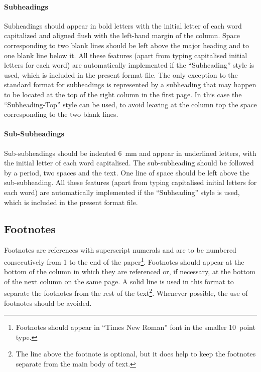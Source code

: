 \documentclass[bibtex,pagenumbers]{stabs2021}
\begin{document}
\paragraph{Subheadings}

Subheadings should appear in bold letters with the initial letter of
each word capitalized and aligned flush with the left-hand margin of
the column. Space corresponding to two blank lines should be left
above the major heading and to one blank line below it. All these
features (apart from typing capitalised initial letters for each word)
are automatically implemented if the ``Subheading'' style is used,
which is included in the present format file. The only exception to
the standard format for subheadings is represented by a subheading
that may happen to be located at the top of the right column in the
first page. In this case the ``Subheading-Top'' style can be used, to
avoid leaving at the column top the space corresponding to the two
blank lines.

\paragraph{Sub-Subheadings}

Sub-subheadings should be indented 6~mm and appear in underlined
letters, with the initial letter of each word capitalised. The
sub-subheading should be followed by a period, two spaces and the
text. One line of space should be left above the sub-subheading. All
these features (apart from typing capitalised initial letters for each
word) are automatically implemented if the ``Subheading'' style is
used, which is included in the present format file.

\subsection{Footnotes}

Footnotes are references with superscript numerals and are to be
numbered consecutively from 1 to the end of the
paper\footnote{Footnotes should appear in ``Times New Roman'' font in
the smaller 10~point type.}. Footnotes should appear at the bottom of
the column in which they are referenced or, if necessary, at the
bottom of the next column on the same page. A solid line is used in
this format to separate the footnotes from the rest of the
text\footnote{The line above the footnote is optional, but it does
help to keep the footnotes separate from the main body of text.}.
Whenever possible, the use of footnotes should be avoided.
\end{document}
